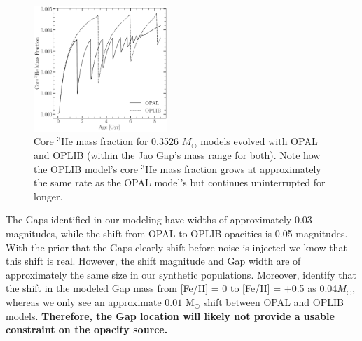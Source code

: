 \begin{figure}
	\centering
	\includegraphics[width=0.45\textwidth]{Core3HECompSameMass.pdf}
	\caption{Core $^{3}$He mass fraction for  0.3526 $M_{\odot}$ models evolved
	with OPAL and OPLIB (within the Jao Gap's mass range for both). Note how
	the OPLIB model's core $^{3}$He mass fraction grows at approximately the
	same rate as the OPAL model's but continues uninterrupted for longer.}
	\label{fig:OPALOPLIB3He}
\end{figure}

The Gaps identified in our modeling have widths of approximately 0.03
magnitudes, while the shift from OPAL to OPLIB opacities is 0.05 magnitudes.
With the prior that the Gaps clearly shift before noise is injected we know
that this shift is real. However, the shift magnitude and Gap width are of
approximately the same size in our synthetic populations. Moreover,
\citet{Feiden2021} identify that the shift in the modeled Gap mass from [Fe/H]
= 0 to [Fe/H] = +0.5 as 0.04$M_{\odot}$, whereas we only see an approximate
$0.01$ M$_{\odot}$ shift between OPAL and OPLIB models. \textbf{Therefore, the
Gap location will likely not provide a usable constraint on the opacity
source.} 
